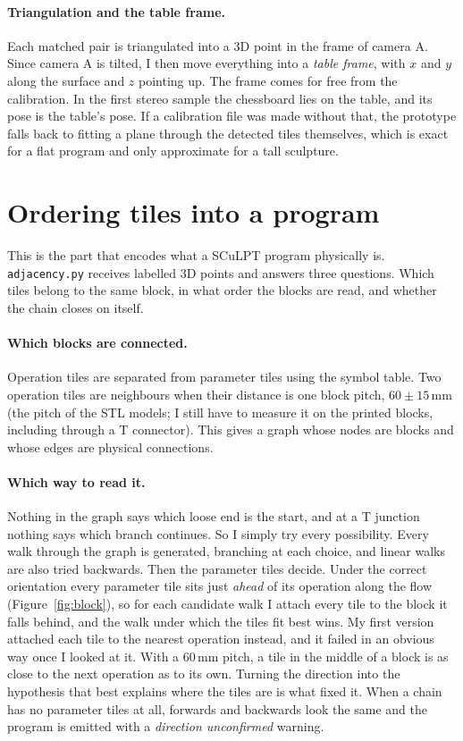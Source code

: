\documentclass[11pt,a4paper]{article}
\newcommand{\code}[1]{\texttt{#1}}
\begin{document}
\paragraph{Triangulation and the table frame.} Each matched pair is triangulated into a 3D point in the frame of camera A. Since camera A is tilted, I then move everything into a \emph{table frame}, with $x$ and $y$ along the surface and $z$ pointing up. The frame comes for free from the calibration. In the first stereo sample the chessboard lies on the table, and its pose is the table's pose. If a calibration file was made without that, the prototype falls back to fitting a plane through the detected tiles themselves, which is exact for a flat program and only approximate for a tall sculpture.

\section{Ordering tiles into a program}

This is the part that encodes what a SCuLPT program physically is. \code{adjacency.py} receives labelled 3D points and answers three questions. Which tiles belong to the same block, in what order the blocks are read, and whether the chain closes on itself.

\paragraph{Which blocks are connected.} Operation tiles are separated from parameter tiles using the symbol table. Two operation tiles are neighbours when their distance is one block pitch, $60 \pm 15$\,mm (the pitch of the STL models; I still have to measure it on the printed blocks, including through a T connector). This gives a graph whose nodes are blocks and whose edges are physical connections.

\paragraph{Which way to read it.} Nothing in the graph says which loose end is the start, and at a T junction nothing says which branch continues. So I simply try every possibility. Every walk through the graph is generated, branching at each choice, and linear walks are also tried backwards. Then the parameter tiles decide. Under the correct orientation every parameter tile sits just \emph{ahead} of its operation along the flow (Figure~\ref{fig:block}), so for each candidate walk I attach every tile to the block it falls behind, and the walk under which the tiles fit best wins. My first version attached each tile to the nearest operation instead, and it failed in an obvious way once I looked at it. With a $60$\,mm pitch, a tile in the middle of a block is as close to the next operation as to its own. Turning the direction into the hypothesis that best explains where the tiles are is what fixed it. When a chain has no parameter tiles at all, forwards and backwards look the same and the program is emitted with a \emph{direction unconfirmed} warning.
\end{document}

